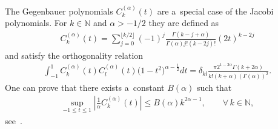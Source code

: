 \documentclass[11pt]{article}
\numberwithin{equation}{section}
\numberwithin{theorem}{section}
\numberwithin{proposition}{section}
\numberwithin{lemma}{section}
\numberwithin{corollary}{section}
\numberwithin{definition}{section}
\numberwithin{example}{section}
\numberwithin{remark}{section}
\numberwithin{note}{section}
\theoremstyle{remark}
\newcommand{\mN}{\mathbb{N}}
\def\a{{\alpha}}
\begin{document}
The Gegenbauer polynomials $C^{(\alpha)}_k(t)$ are a~special case of the Jacobi polynomials.
For $k\in\mN$ and $\alpha>-1/2$ they are def\/ined as
\begin{gather*}
C_k^{(\alpha)}(t)=\sum_{j=0}^{\lfloor
k/2\rfloor}(-1)^j\frac{\Gamma(k-j+\alpha)}{\Gamma(\alpha)j!(k-2j)!}(2t)^{k-2j}
\end{gather*}
and satisfy the orthogonality relation
\begin{gather*}
\int_{-1}^1C_k^{(\alpha)}(t)C_l^{(\alpha)}(t)\big(1-t^2\big)^{\alpha-\frac{1}{2}}dt=\delta_{kl}\frac{\pi2^{1
-2\alpha}\Gamma(k+2\alpha)}{k!(k+\alpha)(\Gamma(\alpha))^2}.
\end{gather*}
One can prove that there exists a~constant $B(\a)$ such that
\begin{gather}\label{estimateGeg}
\sup_{-1\leq t\leq1}\left|\frac{1}{\a}C_k^{(\alpha)}(t)\right|\leq B(\a)k^{2\a-1},\qquad
\forall\, k\in\mN,
\end{gather}
see~\cite[Lemma 4.9]{Orsted2}.
\end{document}
